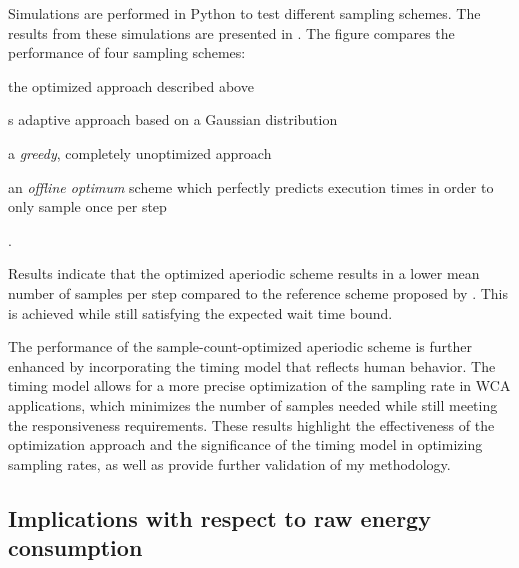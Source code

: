 Simulations are performed in Python to test different sampling schemes.
The results from these simulations are presented in .
The figure compares the performance of four sampling schemes:
\begin{inlineenum}
    \item the optimized approach described above
    \item \citeauthor{wang2019towards}s adaptive approach based on a Gaussian distribution
    \item a \emph{greedy}, completely unoptimized approach
    \item an \emph{offline optimum} scheme which perfectly predicts execution times in order to only sample once per step
\end{inlineenum}.

Results indicate that the optimized aperiodic scheme results in a lower mean number of samples per step compared to the reference scheme proposed by \citeauthor{wang2019towards}.
This is achieved while still satisfying the expected wait time bound.

The performance of the sample-count-optimized aperiodic scheme is further enhanced by incorporating the timing model that reflects human behavior.
The timing model allows for a more precise optimization of the sampling rate in \gls{WCA} applications, which minimizes the number of samples needed while still meeting the responsiveness requirements.
These results highlight the effectiveness of the optimization approach and the significance of the timing model in optimizing sampling rates, as well as provide further validation of my methodology.


\subsection{Implications with respect to raw energy consumption}\label{ssec:implications:energy}

